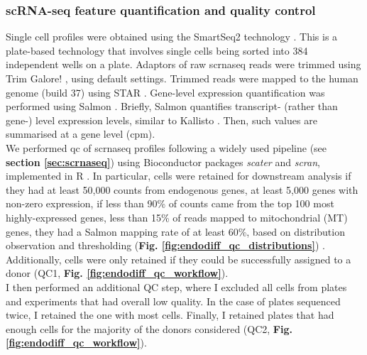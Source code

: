 \subsubsection{scRNA-seq feature quantification and quality control}

Single cell profiles were obtained using the SmartSeq2 technology \cite{picelli2013smart}. 
This is a plate-based technology that involves single cells being sorted into 384 independent wells on a plate. 
Adaptors of raw \gls{scrnaseq} reads were trimmed using Trim Galore! \cite{galore2015wrapper, martin2011cutadapt, andrews2010fastqc}, using default settings. 
Trimmed reads were mapped to the human genome (build 37) using STAR \cite{dobin2013star}. 
Gene-level expression quantification was performed using Salmon \cite{patro2017salmon}. 
Briefly, Salmon quantifies transcript- (rather than gene-) level expression levels, similar to Kallisto \cite{bray2016near}.
Then, such values are summarised at a gene level (\gls{cpm}).\\

We performed \gls{qc} of \gls{scrnaseq} profiles following a widely used pipeline (see \textbf{section \ref{sec:scrnaseq}}) using Bioconductor packages \textit{scater} and \textit{scran}, implemented in R \cite{lun2016step, mccarthy2017scater, lun2019singlecellexperiment}.  
In particular, cells were retained for downstream analysis if they had at least 50,000 counts from endogenous genes, at least 5,000 genes with non-zero expression, if less than 90\% of counts came from the top 100 most highly-expressed genes, less than 15\% of reads mapped to mitochondrial (MT) genes, they had a Salmon mapping rate of at least 60\%, based on distribution observation and thresholding (\textbf{Fig. \ref{fig:endodiff_qc_distributions}}) \cite{luecken2019current}.
Additionally, cells were only retained if they could be successfully assigned to a donor (QC1, \textbf{Fig. \ref{fig:endodiff_qc_workflow}}). \\ 

I then performed an additional QC step, where I excluded all cells from plates and experiments that had overall low quality.
In the case of plates sequenced twice, I retained the one with most cells.
Finally, I retained plates that had enough cells for the majority of the donors considered (QC2, \textbf{Fig. \ref{fig:endodiff_qc_workflow}}). 


